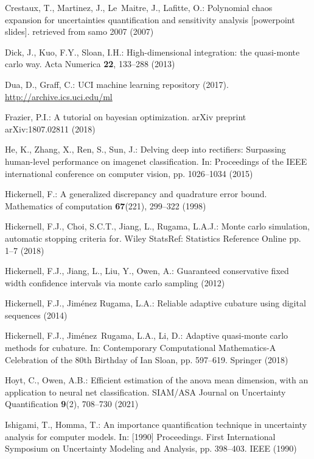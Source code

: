 \documentclass[graybox]{svmult}
\begin{document}
\begin{thebibliography}{10}
Crestaux, T., Martinez, J., Le~Maitre, J., Lafitte, O.: Polynomial chaos
  expansion for uncertainties quantification and sensitivity analysis
  [powerpoint slides]. retrieved from samo 2007 (2007)

Dick, J., Kuo, F.Y., Sloan, I.H.: High-dimensional integration: the quasi-monte
  carlo way.
\newblock Acta Numerica \textbf{22}, 133--288 (2013)

Dua, D., Graff, C.: {UCI} machine learning repository (2017).
\newblock \urlprefix\url{http://archive.ics.uci.edu/ml}

Frazier, P.I.: A tutorial on bayesian optimization.
\newblock arXiv preprint arXiv:1807.02811  (2018)

He, K., Zhang, X., Ren, S., Sun, J.: Delving deep into rectifiers: Surpassing
  human-level performance on imagenet classification.
\newblock In: Proceedings of the IEEE international conference on computer
  vision, pp. 1026--1034 (2015)

Hickernell, F.: A generalized discrepancy and quadrature error bound.
\newblock Mathematics of computation \textbf{67}(221), 299--322 (1998)

Hickernell, F.J., Choi, S.C.T., Jiang, L., Rugama, L.A.J.: Monte carlo
  simulation, automatic stopping criteria for.
\newblock Wiley StatsRef: Statistics Reference Online pp. 1--7 (2018)

Hickernell, F.J., Jiang, L., Liu, Y., Owen, A.: Guaranteed conservative fixed
  width confidence intervals via monte carlo sampling (2012)

Hickernell, F.J., {Jim\'enez Rugama}, L.A.: Reliable adaptive cubature using
  digital sequences (2014)

Hickernell, F.J., Jim\'{e}nez~Rugama, L.A., Li, D.: Adaptive quasi-monte carlo
  methods for cubature.
\newblock In: Contemporary Computational Mathematics-A Celebration of the 80th
  Birthday of Ian Sloan, pp. 597--619. Springer (2018)

Hoyt, C., Owen, A.B.: Efficient estimation of the anova mean dimension, with an
  application to neural net classification.
\newblock SIAM/ASA Journal on Uncertainty Quantification \textbf{9}(2),
  708--730 (2021)

Ishigami, T., Homma, T.: An importance quantification technique in uncertainty
  analysis for computer models.
\newblock In: [1990] Proceedings. First International Symposium on Uncertainty
  Modeling and Analysis, pp. 398--403. IEEE (1990)


\end{thebibliography}
\end{document}

